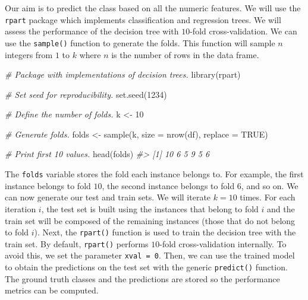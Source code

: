 \documentclass[
  11pt,
]{krantz}
\newenvironment{Shaded}{\begin{snugshade}}{\end{snugshade}}
\newcommand{\AttributeTok}[1]{\textcolor[rgb]{0.61,0.61,0.61}{#1}}
\newcommand{\CommentTok}[1]{\textcolor[rgb]{0.37,0.37,0.37}{\textit{#1}}}
\newcommand{\ConstantTok}[1]{\textcolor[rgb]{0,0,0}{#1}}
\newcommand{\DecValTok}[1]{\textcolor[rgb]{0.06,0.06,0.06}{#1}}
\newcommand{\FunctionTok}[1]{\textcolor[rgb]{0,0,0}{#1}}
\newcommand{\NormalTok}[1]{#1}
\newcommand{\OtherTok}[1]{\textcolor[rgb]{0.37,0.37,0.37}{#1}}
\begin{document}
Our aim is to predict the class based on all the numeric features. We will use the \texttt{rpart} package \citep{rpart} which implements classification and regression trees. We will assess the performance of the decision tree with \(10\)-fold cross-validation. We can use the \texttt{sample()} function to generate the folds. This function will sample \(n\) integers from \(1\) to \(k\) where \(n\) is the number of rows in the data frame.

\begin{Shaded}
\begin{Highlighting}[]
\CommentTok{\# Package with implementations of decision trees.}
\FunctionTok{library}\NormalTok{(rpart)}

\CommentTok{\# Set seed for reproducibility.}
\FunctionTok{set.seed}\NormalTok{(}\DecValTok{1234}\NormalTok{)}

\CommentTok{\# Define the number of folds.}
\NormalTok{k }\OtherTok{\textless{}{-}} \DecValTok{10}

\CommentTok{\# Generate folds.}
\NormalTok{folds }\OtherTok{\textless{}{-}} \FunctionTok{sample}\NormalTok{(k, }\AttributeTok{size =} \FunctionTok{nrow}\NormalTok{(df), }\AttributeTok{replace =} \ConstantTok{TRUE}\NormalTok{)}

\CommentTok{\# Print first 10 values.}
\FunctionTok{head}\NormalTok{(folds)}
\CommentTok{\#\textgreater{} [1] 10  6  5  9  5  6}
\end{Highlighting}
\end{Shaded}

The \texttt{folds} variable stores the fold each instance belongs to. For example, the first instance belongs to fold \(10\), the second instance belongs to fold \(6\), and so on. We can now generate our test and train sets. We will iterate \(k=10\) times. For each iteration \(i\), the test set is built using the instances that belong to fold \(i\) and the train set will be composed of the remaining instances (those that do not belong to fold \(i\)). Next, the \texttt{rpart()} function is used to train the decision tree with the train set. By default, \texttt{rpart()} performs \(10\)-fold cross-validation internally. To avoid this, we set the parameter \texttt{xval\ =\ 0}. Then, we can use the trained model to obtain the predictions on the test set with the generic \texttt{predict()} function. The ground truth classes and the predictions are stored so the performance metrics can be computed.
\end{document}
